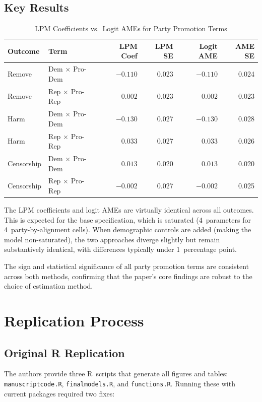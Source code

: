 \documentclass[12pt, a4paper]{article}
\renewcommand\_{\textunderscore\hspace{0pt}}
\begin{document}
\subsection{Key Results}

\begin{table}[H]
\centering
\caption{LPM Coefficients vs.\ Logit AMEs for Party Promotion Terms}
\label{tab:comparison}
\begin{tabular}{llrrrr}
\toprule
Outcome & Term & LPM Coef & LPM SE & Logit AME & AME SE \\
\midrule
Remove & Dem $\times$ Pro-Dem & $-0.110$ & 0.023 & $-0.110$ & 0.024 \\
Remove & Rep $\times$ Pro-Rep & $0.002$ & 0.023 & $0.002$ & 0.023 \\
Harm & Dem $\times$ Pro-Dem & $-0.130$ & 0.027 & $-0.130$ & 0.028 \\
Harm & Rep $\times$ Pro-Rep & $0.033$ & 0.027 & $0.033$ & 0.026 \\
Censorship & Dem $\times$ Pro-Dem & $0.013$ & 0.020 & $0.013$ & 0.020 \\
Censorship & Rep $\times$ Pro-Rep & $-0.002$ & 0.027 & $-0.002$ & 0.025 \\
\bottomrule
\end{tabular}
\end{table}

The LPM coefficients and logit AMEs are virtually identical across all outcomes. This is expected for the base specification, which is saturated (4~parameters for 4~party-by-alignment cells). When demographic controls are added (making the model non-saturated), the two approaches diverge slightly but remain substantively identical, with differences typically under 1~percentage point.

The sign and statistical significance of all party promotion terms are consistent across both methods, confirming that the paper's core findings are robust to the choice of estimation method.

\section{Replication Process}

\subsection{Original R Replication}
The authors provide three R~scripts that generate all figures and tables: \texttt{manuscript\_code.R}, \texttt{final\_models.R}, and \texttt{functions.R}.
Running these with current packages required two fixes:
\end{document}
